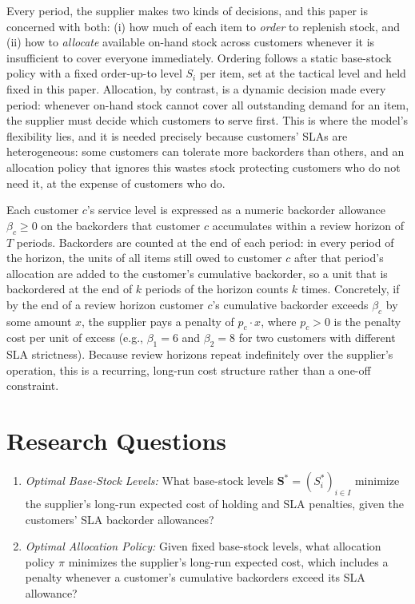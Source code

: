 \documentclass[11pt, a4paper]{article}
\theoremstyle{definition}
\theoremstyle{remark}
\begin{document}
Every period, the supplier makes two kinds of decisions, and this paper is concerned with both: (i) how much of each item to \emph{order} to replenish stock, and (ii) how to \emph{allocate} available on-hand stock across customers whenever it is insufficient to cover everyone immediately. Ordering follows a static base-stock policy with a fixed order-up-to level $S_i$ per item, set at the tactical level and held fixed in this paper. Allocation, by contrast, is a dynamic decision made every period: whenever on-hand stock cannot cover all outstanding demand for an item, the supplier must decide which customers to serve first. This is where the model's flexibility lies, and it is needed precisely because customers' SLAs are heterogeneous: some customers can tolerate more backorders than others, and an allocation policy that ignores this wastes stock protecting customers who do not need it, at the expense of customers who do.

Each customer $c$'s service level is expressed as a numeric backorder allowance $\beta_c \geq 0$ on the backorders that customer $c$ accumulates within a review horizon of $T$ periods. Backorders are counted at the end of each period: in every period of the horizon, the units of all items still owed to customer $c$ after that period's allocation are added to the customer's cumulative backorder, so a unit that is backordered at the end of $k$ periods of the horizon counts $k$ times. Concretely, if by the end of a review horizon customer $c$'s cumulative backorder exceeds $\beta_c$ by some amount $x$, the supplier pays a penalty of $p_c \cdot x$, where $p_c > 0$ is the penalty cost per unit of excess (e.g., $\beta_1 = 6$ and $\beta_2 = 8$ for two customers with different SLA strictness). Because review horizons repeat indefinitely over the supplier's operation, this is a recurring, long-run cost structure rather than a one-off constraint.

\section{Research Questions}

\begin{enumerate}
    \item[\textbf{RQ1}] \textit{Optimal Base-Stock Levels:} What base-stock levels $\mathbf{S}^* = (S_i^*)_{i \in I}$ minimize the supplier's long-run expected cost of holding and SLA penalties, given the customers' SLA backorder allowances?

    \item[\textbf{RQ2}] \textit{Optimal Allocation Policy:} Given fixed base-stock levels, what allocation policy $\pi$ minimizes the supplier's long-run expected cost, which includes a penalty whenever a customer's cumulative backorders exceed its SLA allowance?
\end{enumerate}
\end{document}
